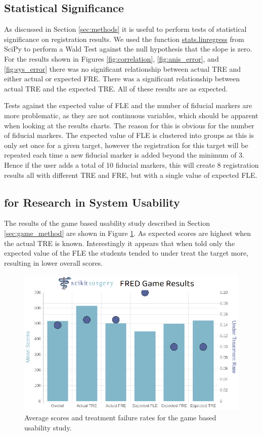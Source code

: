 \subsection{Statistical Significance}
As discussed in Section \ref{sec:methods} it is useful to perform tests of 
statistical significance on  registration results. 
We used the function \href{https://docs.scipy.org/doc/scipy/reference/generated/scipy.stats.linregress.html}{stats.linregress} from {SciPy}\cite{2020SciPy-NMeth} to
perform a Wald Test against the null hypothesis that the slope is zero. For the
results shown in Figures \ref{fig:correlation}, \ref{fig:anis_error}, 
and \ref{fig:sys_error} there was no significant
relationship between actual \gls{TRE} and either actual or expected \gls{FRE}. There was
a significant relationship between actual \gls{TRE} and the expected \gls{TRE}. All
of these results are as expected.

Tests against the expected value of \gls{FLE} and the number of fiducial markers are
more problematic, as they are not continuous variables, which should be apparent 
when looking at the results charts. The reason for this is obvious for the number
of fiducial markers. The expected value of \gls{FLE} is clustered into groups as this
is only set once for a given target, however the registration for this target 
will be repeated each time a new fiducial marker is added beyond the minimum of 3. Hence 
if the user adds a total of 10 fiducial markers, this will create 8 registration 
results all with different \gls{TRE} and \gls{FRE}, but with a single value of 
expected \gls{FLE}.


\subsection{\fred for Research in System Usability}
The results of the game based usability study described in Section \ref{sec:game_method}
are shown in 
Figure \ref{fig:usability}. As expected scores are 
highest when the actual \gls{TRE} is known. Interestingly it appears that when told only the expected value of the \gls{FLE} the students
tended to under treat the target more, resulting in lower overall scores. 


\begin{figure}
        \begin{center}
        \includegraphics[width=0.5\linewidth]{usability.eps}
                \caption{\label{fig:usability}Average scores and treatment failure rates for the game based usability study.}
	\end{center}
\end{figure}

